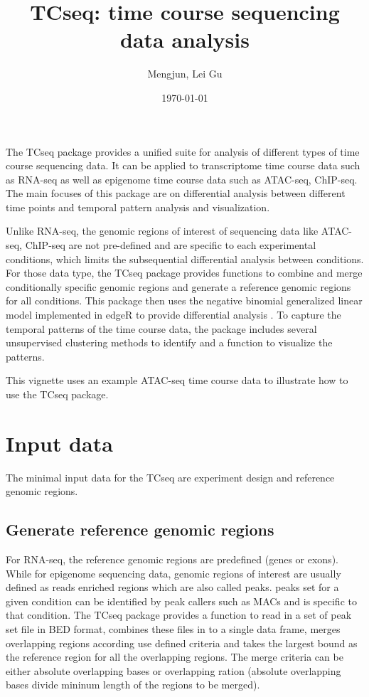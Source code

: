 \documentclass[a4paper]{article}
\title{TCseq: time course sequencing data analysis}
\author{Mengjun, Lei Gu}
\date{ \today }
\begin{document}

\maketitle

The TCseq package provides a unified suite for analysis of different types of time course sequencing data. It can be applied to transcriptome time course data such as RNA-seq as well as epigenome time course data such as ATAC-seq, ChIP-seq. The main focuses of this package are on differential analysis between different time points and temporal pattern analysis and visualization.

Unlike RNA-seq,  the genomic regions of interest of sequencing data like ATAC-seq, ChIP-seq are not pre-defined and are specific to each experimental conditions, which limits the subsequential differential analysis between conditions. For those data type, the TCseq package provides functions to combine and merge conditionally specific genomic regions and generate a reference genomic regions for all conditions. This package then uses the negative binomial generalized linear model implemented in edgeR to provide differential analysis \cite{Robinson}. To capture the temporal patterns of the time course data, the package includes several unsupervised clustering methods to identify and a function to visualize the patterns.

This vignette uses an example ATAC-seq time course data to illustrate how to use the TCseq package.

\section{Input data}
The minimal input data for the TCseq are experiment design and reference genomic regions.

\subsection{Generate reference genomic regions}
For RNA-seq, the reference genomic regions are predefined (genes or exons). While for epigenome sequencing data, genomic regions of interest are usually defined as reads enriched regions which are also called peaks. peaks set for a given condition can be identified by peak callers such as MACs and is specific to that condition. The TCseq package provides a function to read in a set of peak set file in BED format, combines these files in to a single data frame, merges overlapping regions according use defined criteria and takes the largest bound as the reference region for all the overlapping regions. The merge criteria can be either absolute overlapping bases or overlapping ration (absolute overlapping bases divide mininum length of the regions to be merged).
\end{document}
